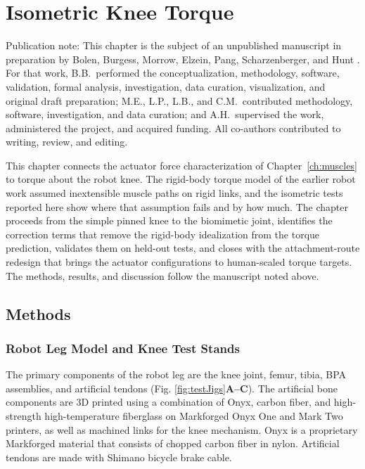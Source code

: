 \chapter{Isometric Knee Torque}\label{ch:torque}\label{ch:results}
\graphicspath{{../Figures/30-torque/}{figs/30-torque/}}

{\doublespacing\normalsize\upshape
\noindent Publication note: This chapter is the subject of an unpublished manuscript in preparation by Bolen, Burgess, Morrow, Elzein, Pang, Scharzenberger, and Hunt \citep{bolen_isometric_2025}. For that work, B.B.\ performed the conceptualization, methodology, software, validation, formal analysis, investigation, data curation, visualization, and original draft preparation; M.E., L.P., L.B., and C.M.\ contributed methodology, software, investigation, and data curation; and A.H.\ supervised the work, administered the project, and acquired funding. All co-authors contributed to writing, review, and editing.\par}

This chapter connects the actuator force characterization of Chapter~\ref{ch:muscles} to torque about the robot knee. The rigid-body torque model of the earlier robot work assumed inextensible muscle paths on rigid links, and the isometric tests reported here show where that assumption fails and by how much. The chapter proceeds from the simple pinned knee to the biomimetic joint, identifies the correction terms that remove the rigid-body idealization from the torque prediction, validates them on held-out tests, and closes with the attachment-route redesign that brings the actuator configurations to human-scaled torque targets. The methods, results, and discussion follow the manuscript noted above.

\section{Methods}

\subsection{Robot Leg Model and Knee Test Stands}\label{sec:robot_model}


The primary components of the robot leg are the knee joint, femur, tibia, BPA assemblies, and artificial tendons (Fig. \ref{fig:testJigs}\textbf{A--C}). The artificial bone components are 3D printed using a combination of Onyx, carbon fiber, and high-strength high-temperature fiberglass on Markforged Onyx One and Mark Two printers, as well as machined links for the knee mechanism. Onyx is a proprietary Markforged material that consists of chopped carbon fiber in nylon. Artificial tendons are made with Shimano bicycle brake cable.

